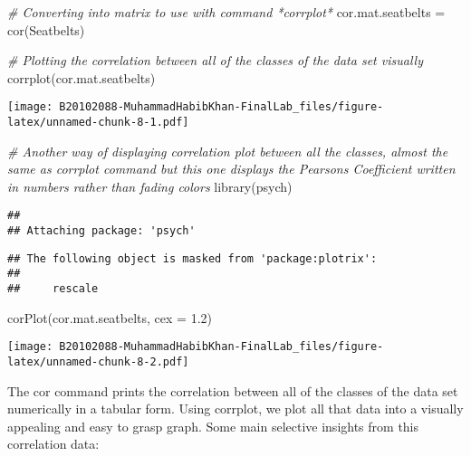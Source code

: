 \documentclass[
]{article}
\newenvironment{Shaded}{\begin{snugshade}}{\end{snugshade}}
\newcommand{\AttributeTok}[1]{\textcolor[rgb]{0.77,0.63,0.00}{#1}}
\newcommand{\CommentTok}[1]{\textcolor[rgb]{0.56,0.35,0.01}{\textit{#1}}}
\newcommand{\FloatTok}[1]{\textcolor[rgb]{0.00,0.00,0.81}{#1}}
\newcommand{\FunctionTok}[1]{\textcolor[rgb]{0.00,0.00,0.00}{#1}}
\newcommand{\NormalTok}[1]{#1}
\newcommand{\OtherTok}[1]{\textcolor[rgb]{0.56,0.35,0.01}{#1}}
\begin{document}
\begin{Shaded}
\begin{Highlighting}[]
\CommentTok{\# Converting into matrix to use with command *corrplot* }
\NormalTok{cor.mat.seatbelts }\OtherTok{=} \FunctionTok{cor}\NormalTok{(Seatbelts)}

\CommentTok{\# Plotting the correlation between all of the classes of the data set visually}
\FunctionTok{corrplot}\NormalTok{(cor.mat.seatbelts)}
\end{Highlighting}
\end{Shaded}

\texttt{[image: B20102088-MuhammadHabibKhan-FinalLab\_files/figure-latex/unnamed-chunk-8-1.pdf]}

\begin{Shaded}
\begin{Highlighting}[]
\CommentTok{\# Another way of displaying correlation plot between all the classes, almost the same as corrplot command but this one displays the Pearson\textquotesingle{}s Coefficient written in numbers rather than fading colors}
\FunctionTok{library}\NormalTok{(psych)}
\end{Highlighting}
\end{Shaded}

\begin{verbatim}
## 
## Attaching package: 'psych'
\end{verbatim}

\begin{verbatim}
## The following object is masked from 'package:plotrix':
## 
##     rescale
\end{verbatim}

\begin{Shaded}
\begin{Highlighting}[]
\FunctionTok{corPlot}\NormalTok{(cor.mat.seatbelts, }\AttributeTok{cex =} \FloatTok{1.2}\NormalTok{)}
\end{Highlighting}
\end{Shaded}

\texttt{[image: B20102088-MuhammadHabibKhan-FinalLab\_files/figure-latex/unnamed-chunk-8-2.pdf]}

The cor command prints the correlation between all of the classes of the
data set numerically in a tabular form. Using corrplot, we plot all that
data into a visually appealing and easy to grasp graph. Some main
selective insights from this correlation data:
\end{document}
